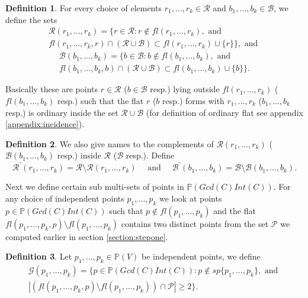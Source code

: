 \documentclass[12pt]{caltech_thesis}
\theoremstyle{plain}
\theoremstyle{definition}
\newtheorem{definition}{Definition}
\newcommand{\MB}{\mathcal{B}}
\newcommand{\MP}{\mathcal{P}}
\newcommand{\MR}{\mathcal{R}}
\newcommand{\MG}{\mathcal{G}}
\newcommand{\PP}{\mathbb{P}}
\begin{document}
\begin{definition}
For every choice of elements $r_1,\ldots,r_k \in \MR$ and $b_1,\ldots,b_k\in \MB$,
we define the sets
\nonumber\begin{multline}
 \MR(r_1,\ldots,r_k) = \{r\in \MR : r\notin fl(r_1,\ldots,r_k), \text{ and } \\ fl(r_1,\ldots,r_k,r)\cap (\MR\cup \MB) \subset 
 fl(r_1,\ldots,r_k)\cup\{r\} \}, \text{ and }
\end{multline}
\nonumber\begin{multline}
 \MB(b_1,\ldots,b_k) = \{b\in \MB : b\notin fl(b_1,\ldots,b_k), \text{ and }\\ fl(b_1,\ldots,b_k,b)\cap (\MR\cup \MB) \subset 
 fl(b_1,\ldots,b_k)\cup\{b\} \}.
\end{multline} 

Basically these are points $r\in \MR$ ($b\in \MB$ resp.) lying outside $fl(r_1,\ldots,r_k)$ ($fl(b_1,\ldots,b_k)$ resp.) such that the flat 
$r$ ($b$ resp.) forms with $r_1,\ldots,r_k$ ($b_1,\ldots,b_k$ resp.) is ordinary inside the set $\MR\cup \MB$ 
(for definition of ordinary flat see appendix \ref{appendix:incidence}).  

\end{definition}

\begin{definition}
 We also give names to the complements of $\MR(r_1,\ldots,r_k)$ ($\MB(b_1,\ldots,b_k)$ resp.) inside $\MR$ ($\MB$ resp.). Define
\[
 \MR^\prime(r_1,\ldots,r_k) = \MR\setminus \MR(r_1,\ldots,r_k) \hspace{1em} \text{ and }\hspace{1em} \MB^\prime(b_1,\ldots,b_k) = \MB\setminus 
 \MB(b_1,\ldots,b_k).
\]

\end{definition}


Next we define certain sub multi-sets of points in $\PP(Gcd(C)Int(C))$. For any choice of independent points
$p_1,\ldots,p_k$ we look at points $p\in \PP(Gcd(C)Int(C))$ such that $p\notin fl(p_1,\ldots,p_k)$
and the flat $fl(p_1,\ldots,p_k,p)\setminus fl(p_1,\ldots,p_k)$ contains two distinct points from the set $\MP$
we computed earlier in section \ref{section:stepone}. 
\begin{definition}
Let $p_1,\ldots,p_k \in \PP(V)$ be independent points, we define 
\begin{multline}
 \MG(p_1,\ldots,p_k) = \{p\in \PP(Gcd(C)Int(C)) : p\notin sp\{p_1,\ldots,p_k\}, \text{ and }\\
 |(fl(p_1,\ldots,p_k,p)\setminus fl(p_1,\ldots,p_k))\cap \MP|\geq 2 \}.
\end{multline} 
\end{definition}
\end{document}
